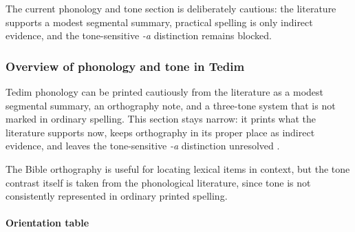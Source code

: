 \documentclass[
  11pt,
  a4paper,
]{article}
\newcommand{\tdim}[1]{\textit{#1}}
\begin{document}
The current phonology and tone section is deliberately cautious: the
literature supports a modest segmental summary, practical spelling is
only indirect evidence, and the tone-sensitive \tdim{-a} distinction
remains blocked.

\subsubsection{Overview of phonology and tone in
Tedim}\label{overview-of-phonology-and-tone-in-tedim}

Tedim phonology can be printed cautiously from the literature as a
modest segmental summary, an orthography note, and a three-tone system
that is not marked in ordinary spelling. This section stays narrow: it
prints what the literature supports now, keeps orthography in its proper
place as indirect evidence, and leaves the tone-sensitive \tdim{-a}
distinction unresolved
\citetext{\citealp[pp.~9-13]{henderson1965}; \citealp[pp.~25-26, 37,
57-60]{zamngaihcing2017}}.

The Bible orthography is useful for locating lexical items in context,
but the tone contrast itself is taken from the phonological literature,
since tone is not consistently represented in ordinary printed spelling.

\paragraph{Orientation table}\label{orientation-table}
\end{document}

